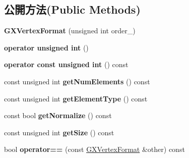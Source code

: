 \subsection*{公開方法(Public Methods)}
\begin{DoxyCompactItemize}
\item 
{\bfseries G\+X\+Vertex\+Format} (unsigned int order\+\_)\hypertarget{class_magnum_1_1_g_x_vertex_format_a0c437404ed580ea5f39b05008640825f}{}\label{class_magnum_1_1_g_x_vertex_format_a0c437404ed580ea5f39b05008640825f}

\item 
{\bfseries operator unsigned int} ()\hypertarget{class_magnum_1_1_g_x_vertex_format_ae31cb6cf67b5ad9d91d3b47720491099}{}\label{class_magnum_1_1_g_x_vertex_format_ae31cb6cf67b5ad9d91d3b47720491099}

\item 
{\bfseries operator const unsigned int} () const \hypertarget{class_magnum_1_1_g_x_vertex_format_ab392de93e90998164afacf890a714c93}{}\label{class_magnum_1_1_g_x_vertex_format_ab392de93e90998164afacf890a714c93}

\item 
const unsigned int {\bfseries get\+Num\+Elements} () const \hypertarget{class_magnum_1_1_g_x_vertex_format_a043238b827c8d500bd18badf3a57ec0c}{}\label{class_magnum_1_1_g_x_vertex_format_a043238b827c8d500bd18badf3a57ec0c}

\item 
const unsigned int {\bfseries get\+Element\+Type} () const \hypertarget{class_magnum_1_1_g_x_vertex_format_a5e8773bbc9bbf81b8d661fd6e3d067ce}{}\label{class_magnum_1_1_g_x_vertex_format_a5e8773bbc9bbf81b8d661fd6e3d067ce}

\item 
const bool {\bfseries get\+Normalize} () const \hypertarget{class_magnum_1_1_g_x_vertex_format_aa1f5e1dcf86444be648d377b73b411f2}{}\label{class_magnum_1_1_g_x_vertex_format_aa1f5e1dcf86444be648d377b73b411f2}

\item 
const unsigned int {\bfseries get\+Size} () const \hypertarget{class_magnum_1_1_g_x_vertex_format_ae5cbfcb8655f112b2703f66146b67788}{}\label{class_magnum_1_1_g_x_vertex_format_ae5cbfcb8655f112b2703f66146b67788}

\item 
bool {\bfseries operator==} (const \hyperlink{class_magnum_1_1_g_x_vertex_format}{G\+X\+Vertex\+Format} \&other) const \hypertarget{class_magnum_1_1_g_x_vertex_format_a5e9d1762f6020ba44d174370f7af98e0}{}\label{class_magnum_1_1_g_x_vertex_format_a5e9d1762f6020ba44d174370f7af98e0}


\end{DoxyCompactItemize}
